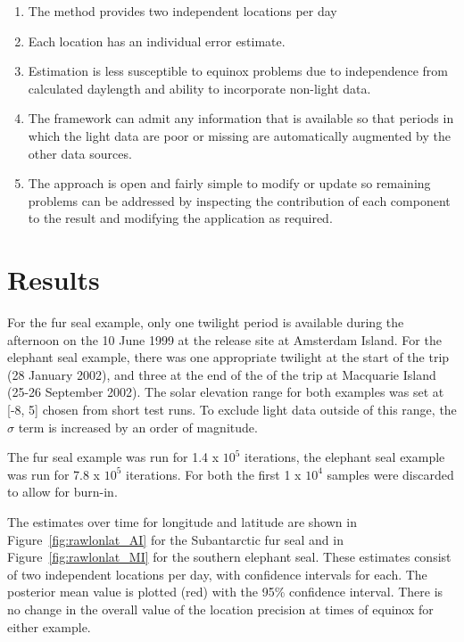 \documentclass[10pt]{article}
\begin{document}
\begin{enumerate}
\item{The method provides two independent locations per day}
\item{Each location has an individual error estimate.}
\item{Estimation is less susceptible to equinox problems due to
    independence from calculated daylength and ability to incorporate
    non-light data.}
\item{The framework can admit any information that is available so
    that periods in which the light data are poor or missing are
    automatically augmented by the other data sources.}
\item{The approach is open and fairly simple to modify or update so remaining
    problems can be addressed by inspecting the contribution of each
    component to the result and modifying the application as
    required.}
\end{enumerate}





\section*{Results}

For the fur seal example, only one twilight period is available during
the afternoon on the 10 June 1999 at the release site at Amsterdam
Island. For the elephant seal example, there was one appropriate
twilight at the start of the trip (28 January 2002), and three at the end
of the of the trip at Macquarie Island (25-26 September 2002). The solar
elevation range for both examples was set at [-8, 5] chosen from short
test runs. To exclude light data outside of this range, the $\sigma$
term is increased by an order of magnitude.

The fur seal example was run for 1.4 x $10^{5}$ iterations, the
elephant seal example was run for 7.8 x $10^{5}$ iterations. For both
the first 1 x $10^{4}$ samples were discarded to allow for burn-in.

The estimates over time for longitude and latitude are shown in
Figure~\ref{fig:rawlonlat_AI} for the Subantarctic fur seal and in
Figure~\ref{fig:rawlonlat_MI} for the southern elephant seal. These
estimates consist of two independent locations per day, with
confidence intervals for each. The posterior mean value is plotted
(red) with the 95\% confidence interval. There is no change in the overall value of the location
precision at times of equinox for either example.
\end{document}
